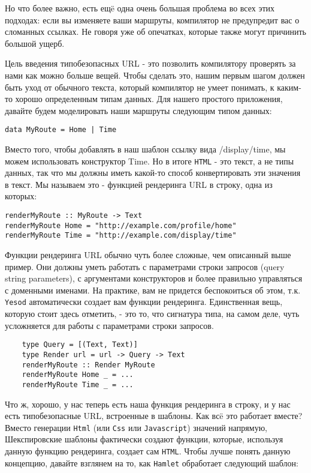 Но что более важно, есть ещë одна очень большая проблема во всех этих подходах:
если вы изменяете ваши маршруты, компилятор не предупредит вас о сломанных
ссылках. Не говоря уже об опечатках, которые также могут причинить большой
ущерб.

Цель введения типобезопасных URL - это позволить компилятору проверять за нами
как можно больше вещей. Чтобы сделать это, нашим первым шагом должен быть уход
от обычного текста, который компилятор не умеет понимать, к каким-то хорошо
определенным типам данных. Для нашего простого приложения, давайте будем
моделировать наши маршруты следующим типом данных:

\begin{lstlisting}
data MyRoute = Home | Time
\end{lstlisting}

Вместо того, чтобы добавлять в наш шаблон ссылку вида /display/time, мы можем
использовать конструктор Time. Но в итоге \texttt{HTML} - это текст, а не типы
данных, так что мы должны иметь какой-то способ конвертировать эти значения в
текст.  Мы называем это - функцией рендеринга URL в строку, одна из которых:

\begin{lstlisting}
renderMyRoute :: MyRoute -> Text
renderMyRoute Home = "http://example.com/profile/home"
renderMyRoute Time = "http://example.com/display/time"
\end{lstlisting}

\begin{remark}
    Функции рендеринга URL обычно чуть более сложные, чем описанный выше
    пример.  Они должны уметь работать с параметрами строки запросов (query
    string parameters), с аргументами конструкторов и более правильно
    управляться с доменными именами.  На практике, вам не придется беспокоиться
    об этом, т.к. \texttt{Yesod} автоматически создает вам функции рендеринга.
    Единственная вещь, которую стоит здесь отметить, - это то, что сигнатура
    типа, на самом деле, чуть усложняется для работы с параметрами строки
    запросов.

    \begin{lstlisting}
    type Query = [(Text, Text)]
    type Render url = url -> Query -> Text
    renderMyRoute :: Render MyRoute
    renderMyRoute Home _ = ...
    renderMyRoute Time _ = ...
    \end{lstlisting}
\end{remark}

Что ж, хорошо, у нас теперь есть наша функция рендеринга в строку, и у нас есть
типобезопасные URL, встроенные в шаблоны. Как всë это работает вместе?  Вместо
генерации \lstinline!Html! (или \lstinline!Css! или \lstinline!Javascript!)
значений напрямую, Шекспировские шаблоны фактически создают функции, которые,
используя данную функцию рендеринга, создает сам \texttt{HTML}. Чтобы лучше
понять данную концепцию, давайте взглянем на то, как \texttt{Hamlet} обработает
следующий шаблон:

